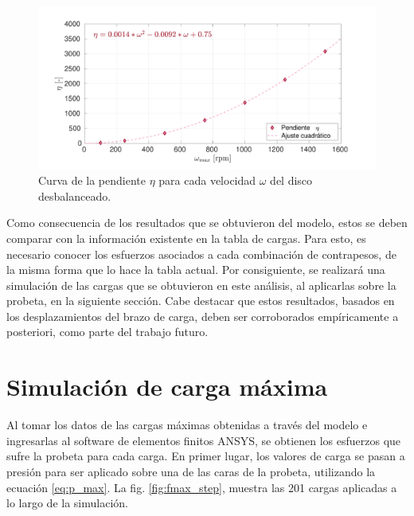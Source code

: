 \begin{figure}[h]
\centering
\includegraphics[width=1\linewidth, trim={1cm 0cm 2cm 1cm}, clip]{Imagenes/eta_w.pdf}
\caption{Curva de la pendiente $\eta$ para cada velocidad $\omega$ del disco desbalanceado.}
\label{fig:eta_w}
\end{figure}

\newpage

Como consecuencia de los resultados que se obtuvieron del modelo, estos se deben comparar con la información existente en la tabla de cargas. Para esto, es necesario conocer los esfuerzos asociados a cada combinación de contrapesos, de la misma forma que lo hace la tabla actual. Por consiguiente, se realizará una simulación de las cargas que se obtuvieron en este análisis, al aplicarlas sobre la probeta, en la siguiente sección. Cabe destacar que estos resultados, basados en los desplazamientos del brazo de carga, deben ser corroborados empíricamente a posteriori, como parte del trabajo futuro. 

\newpage

\section{Simulación de carga máxima}

Al tomar los datos de las cargas máximas obtenidas a través del modelo e ingresarlas al software de elementos finitos ANSYS, se obtienen los esfuerzos que sufre la probeta para cada carga. En primer lugar, los valores de carga se pasan a presión para ser aplicado sobre una de las caras de la probeta, utilizando la ecuación \ref{eq:p_max}. La fig. \ref{fig:fmax_step}, muestra las 201 cargas aplicadas a lo largo de la simulación. 

